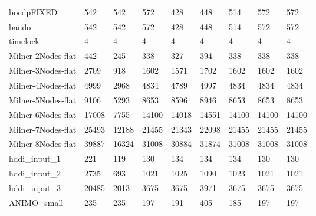 \begin{table}
\begin{adjustbox}{max totalheight=\textheight}
\begin{tabular}{|l|ll|llllll|}
    bocdpFIXED         & 542    & 542      & 572    & 428    & 448    & 514    & 572    & 572    \\
    bando              & 542    & 542      & 572    & 428    & 448    & 514    & 572    & 572    \\
    timelock           & 4      & 4        & 4      & 4      & 4      & 4      & 4      & 4      \\ \hline
    Milner-2Nodes-flat & 442    & 245      & 338    & 327    & 394    & 338    & 338    & 338    \\
    Milner-3Nodes-flat & 2709   & 918      & 1602   & 1571   & 1702   & 1602   & 1602   & 1602   \\
    Milner-4Nodes-flat & 4999   & 2968     & 4834   & 4789   & 4997   & 4834   & 4834   & 4834   \\
    Milner-5Nodes-flat & 9106   & 5293     & 8653   & 8596   & 8946   & 8653   & 8653   & 8653   \\
    Milner-6Nodes-flat & 17008  & 7755     & 14100  & 14018  & 14551  & 14100  & 14100  & 14100  \\
    Milner-7Nodes-flat & 25493  & 12188    & 21455  & 21343  & 22098  & 21455  & 21455  & 21455  \\
    Milner-8Nodes-flat & 39887  & 16324    & 31008  & 30884  & 31874  & 31008  & 31008  & 31008  \\ \hline
    hddi\_input\_1     & 221    & 119      & 130    & 134    & 134    & 134    & 130    & 130    \\
    hddi\_input\_2     & 2735   & 693      & 1021   & 1025   & 1090   & 1023   & 1021   & 1021   \\
    hddi\_input\_3     & 20485  & 2013     & 3675   & 3675   & 3971   & 3675   & 3675   & 3675   \\ \hline
    ANIMO\_small       & 235    & 235      & 197    & 191    & 405    & 185    & 197    & 197    \\ \hline
    \end{tabular}
\end{adjustbox}
\end{table}

